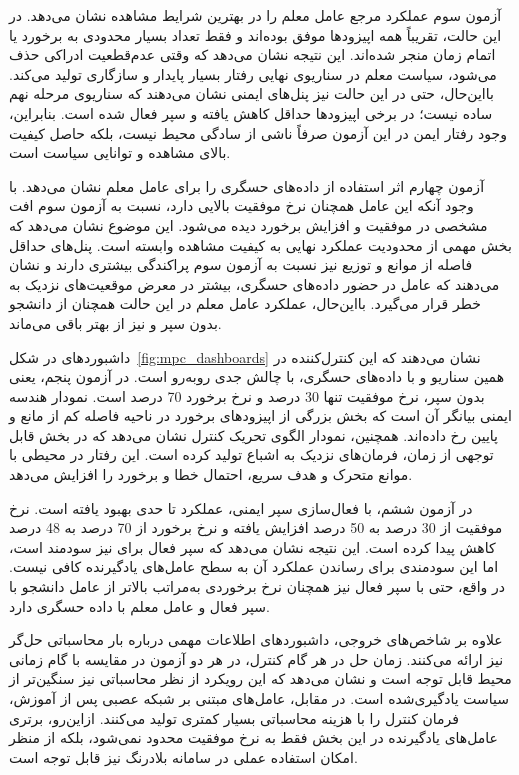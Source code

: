 آزمون سوم عملکرد مرجع عامل معلم را در بهترین شرایط مشاهده نشان می‌دهد. در این حالت، تقریباً همه اپیزودها موفق بوده‌اند و فقط تعداد بسیار محدودی به برخورد یا اتمام زمان منجر شده‌اند. این نتیجه نشان می‌دهد که وقتی عدم‌قطعیت ادراکی حذف می‌شود، سیاست معلم در سناریوی نهایی رفتار بسیار پایدار و سازگاری تولید می‌کند. بااین‌حال، حتی در این حالت نیز پنل‌های ایمنی نشان می‌دهند که سناریوی مرحله نهم ساده نیست؛ در برخی اپیزودها حداقل  کاهش یافته و سپر فعال شده است. بنابراین، وجود رفتار ایمن در این آزمون صرفاً ناشی از سادگی محیط نیست، بلکه حاصل کیفیت بالای مشاهده و توانایی سیاست است.

آزمون چهارم اثر استفاده از داده‌های حسگری را برای عامل معلم نشان می‌دهد. با وجود آنکه این عامل همچنان نرخ موفقیت بالایی دارد، نسبت به آزمون سوم افت مشخصی در موفقیت و افزایش برخورد دیده می‌شود. این موضوع نشان می‌دهد که بخش مهمی از محدودیت عملکرد نهایی به کیفیت مشاهده وابسته است. پنل‌های حداقل فاصله از موانع و توزیع  نیز نسبت به آزمون سوم پراکندگی بیشتری دارند و نشان می‌دهند که عامل در حضور داده‌های حسگری، بیشتر در معرض موقعیت‌های نزدیک به خطر قرار می‌گیرد. بااین‌حال، عملکرد عامل معلم در این حالت همچنان از دانشجو بدون سپر و نیز از  بهتر باقی می‌ماند.

داشبوردهای  در شکل~\ref{fig:mpc_dashboards} نشان می‌دهند که این کنترل‌کننده در همین سناریو و با داده‌های حسگری، با چالش جدی روبه‌رو است. در آزمون پنجم، یعنی  بدون سپر، نرخ موفقیت تنها 30 درصد و نرخ برخورد 70 درصد است. نمودار هندسه ایمنی بیانگر آن است که بخش بزرگی از اپیزودهای برخورد در ناحیه فاصله کم از مانع و  پایین رخ داده‌اند. همچنین، نمودار الگوی تحریک کنترل نشان می‌دهد که  در بخش قابل توجهی از زمان، فرمان‌های نزدیک به اشباع تولید کرده است. این رفتار در محیطی با موانع متحرک و هدف سریع، احتمال خطا و برخورد را افزایش می‌دهد.

در آزمون ششم، با فعال‌سازی سپر ایمنی، عملکرد  تا حدی بهبود یافته است. نرخ موفقیت از 30 درصد به 50 درصد افزایش یافته و نرخ برخورد از 70 درصد به 48 درصد کاهش پیدا کرده است. این نتیجه نشان می‌دهد که سپر فعال برای  نیز سودمند است، اما این سودمندی برای رساندن عملکرد آن به سطح عامل‌های یادگیرنده کافی نیست. در واقع، حتی  با سپر فعال نیز همچنان نرخ برخوردی به‌مراتب بالاتر از عامل دانشجو با سپر فعال و عامل معلم با داده حسگری دارد.

علاوه بر شاخص‌های خروجی، داشبوردهای  اطلاعات مهمی درباره بار محاسباتی حل‌گر نیز ارائه می‌کنند. زمان حل در هر گام کنترل، در هر دو آزمون  در مقایسه با گام زمانی محیط قابل توجه است و نشان می‌دهد که این رویکرد از نظر محاسباتی نیز سنگین‌تر از سیاست یادگیری‌شده است. در مقابل، عامل‌های مبتنی بر شبکه عصبی پس از آموزش، فرمان کنترل را با هزینه محاسباتی بسیار کمتری تولید می‌کنند. ازاین‌رو، برتری عامل‌های یادگیرنده در این بخش فقط به نرخ موفقیت محدود نمی‌شود، بلکه از منظر امکان استفاده عملی در سامانه بلادرنگ نیز قابل توجه است.

